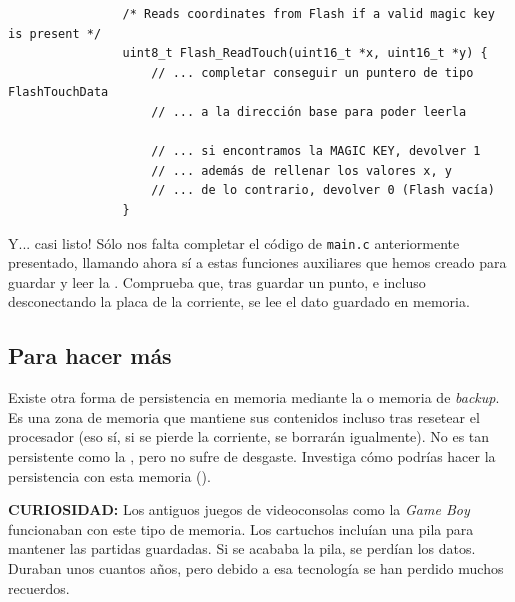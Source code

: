 \documentclass[../main.tex]{subfiles}
\begin{document}
            \begin{lstlisting}
                /* Reads coordinates from Flash if a valid magic key is present */
                uint8_t Flash_ReadTouch(uint16_t *x, uint16_t *y) {
                    // ... completar conseguir un puntero de tipo FlashTouchData
                    // ... a la dirección base para poder leerla
                    
                    // ... si encontramos la MAGIC KEY, devolver 1
                    // ... además de rellenar los valores x, y
                    // ... de lo contrario, devolver 0 (Flash vacía)
                }
            \end{lstlisting}
    
            Y... casi listo! Sólo nos falta completar el código de \texttt{main.c} anteriormente presentado, llamando ahora sí a estas funciones auxiliares que hemos creado para guardar y leer la . Comprueba que, tras guardar un punto, e incluso desconectando la placa de la corriente, se lee el dato guardado en memoria.

    \subsection{Para hacer más}

        Existe otra forma de persistencia en memoria mediante la  o memoria de \emph{backup}. Es una zona de memoria que mantiene sus contenidos incluso tras resetear el procesador (eso sí, si se pierde la corriente, se borrarán igualmente). No es tan persistente como la , pero no sufre de desgaste. Investiga cómo podrías hacer la persistencia con esta memoria (\REFMAN[4.1.3]). 
        
        \textbf{CURIOSIDAD:} Los antiguos juegos de videoconsolas como la \emph{Game Boy} funcionaban con este tipo de memoria. Los cartuchos incluían una pila para mantener las partidas guardadas. Si se acababa la pila, se perdían los datos. Duraban unos cuantos años, pero debido a esa tecnología se han perdido muchos recuerdos.
\end{document}
